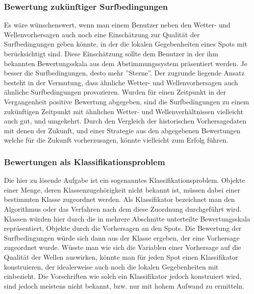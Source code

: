 \subsubsection{Bewertung zukünftiger Surfbedingungen}
Es wäre wünschenswert, wenn man einem Benutzer neben den Wetter- und
Wellenvorhersagen auch noch eine Einschätzung zur Qualität der
Surfbedingungen geben könnte, in der die lokalen Gegebenheiten eines
Spots mit berücksichtigt sind. Diese Einschätzung sollte dem Benutzer
in der ihm bekannten Bewertungsskala aus dem Abstimmungssystem
präsentiert werden. Je besser die Surfbedingungen, desto mehr
''Sterne''. Der zugrunde liegende Ansatz besteht in der Vermutung,
dass ähnliche Wetter- und Wellenvorhersagen auch ähnliche
Surfbedingungen provozieren. Wurden für einen Zeitpunkt in der
Vergangenheit positive Bewertung abgegeben, sind die Surfbedingungen
zu einem zukünftigen Zeitpunkt mit ähnlichen Wetter- und
Wellenverhältnissen vielleicht auch gut, und umgekehrt. Durch den
Vergleich der historischen Vorhersagedaten mit denen der Zukunft, und
einer Strategie aus den abgegebenen Bewertungen welche für die Zukunft
vorherzusagen, könnte vielleicht zum Erfolg führen.

\subsubsection{Bewertungen als Klassifikationsproblem}
Die hier zu lösende Aufgabe ist ein sogenanntes
Klassifikationsproblem. Objekte einer Menge, deren
Klassenzugehörigkeit nicht bekannt ist, müssen dabei einer bestimmten
Klasse zugeordnet werden. Als Klassifikator bezeichnet man den
Algorithmus oder das Verfahren nach dem diese Zuordnung durchgeführt
wird. Klassen würden hier durch die in mehrere Abschnitte unterteilte
Bewertungsskala repräsentiert, Objekte durch die Vorhersagen an den
Spots. Die Bewertung der Surfbedingungen würde sich dann aus der
Klasse ergeben, der eine Vorhersage zugeordnet wurde. Wüsste man wie
sich die Variablen einer Vorhersage auf die Qualität der Wellen
auswirken, könnte man für jeden Spot einen Klassifikator konstruieren,
der idealerweise auch noch die lokalen Gegebenheiten mit
einbezieht. Die Vorschriften wie solch ein Klassifikator jedoch
konstruiert wird, sind jedoch meistens nicht bekannt, bzw. nur mit
hohem Aufwand zu ermitteln.

